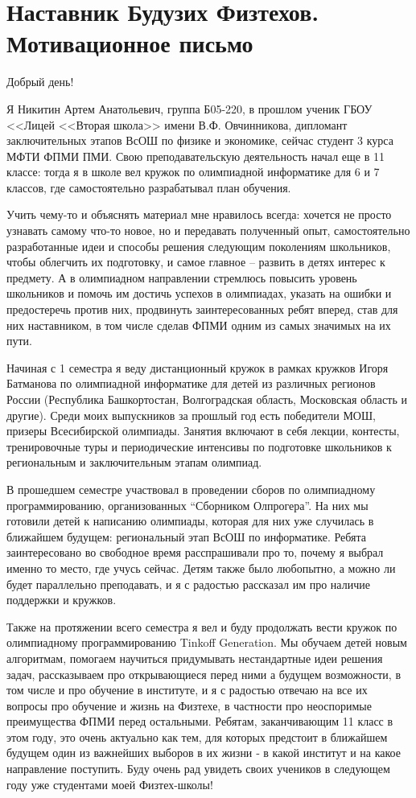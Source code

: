\section{\textbf{Наставник Будузих Физтехов. Мотивационное письмо}}
\smallskip

\quad Добрый день!
\smallskip

\quad Я Никитин Артем Анатольевич, группа Б05-220, в прошлом ученик ГБОУ <<Лицей <<Вторая школа>> имени В.Ф. Овчинникова, дипломант
заключительных этапов ВсОШ по физике и экономике, сейчас студент 3 курса МФТИ ФПМИ ПМИ. Свою преподавательскую деятельность начал еще в 11
классе: тогда я в школе вел кружок по олимпиадной информатике для 6 и 7 классов, где самостоятельно разрабатывал план обучения.

\quad Учить чему-то и объяснять материал мне нравилось всегда: хочется не просто узнавать самому что-то новое, но и передавать полученный опыт,
самостоятельно разработанные идеи и способы решения следующим поколениям школьников, чтобы облегчить их подготовку, и самое главное – развить в
детях интерес к предмету. А в олимпиадном направлении стремлюсь повысить уровень школьников и помочь им достичь успехов в олимпиадах, указать
на ошибки и предостеречь против них, продвинуть заинтересованных ребят вперед, став для них наставником, в том числе сделав ФПМИ одним из самых
значимых на их пути.

\quad Начиная с 1 семестра я веду дистанционный кружок в рамках кружков Игоря Батманова по олимпиадной информатике для детей из различных
регионов России (Республика Башкортостан, Волгоградская область, Московская область и другие). Среди моих выпускников за прошлый год есть
победители МОШ, призеры Всесибирской олимпиады. Занятия включают в себя лекции, контесты, тренировочные туры и периодические интенсивы по
подготовке школьников к региональным и заключительным этапам олимпиад.

\quad В прошедшем семестре участвовал в проведении сборов по олимпиадному программированию, организованных “Сборником Олпрогера”. На них мы
готовили детей к написанию олимпиады, которая для них уже случилась в ближайшем будущем: региональный этап ВсОШ по информатике. Ребята
заинтересовано во свободное время расспрашивали про то, почему я выбрал именно то место, где учусь сейчас. Детям также было любопытно, а можно
ли будет параллельно преподавать, и я с радостью рассказал им про наличие поддержки и кружков.

\quad Также на протяжении всего семестра я вел и буду продолжать вести кружок по олимпиадному программированию Tinkoff Generation. Мы обучаем
детей новым алгоритмам, помогаем научиться придумывать нестандартные идеи решения задач, рассказываем про открывающиеся перед ними а будущем
возможности, в том числе и про обучение в институте, и я с радостью отвечаю на все их вопросы про обучение и жизнь на Физтехе, в частности про
неоспоримые преимущества ФПМИ перед остальными. Ребятам, заканчивающим 11 класс в этом году, это очень актуально как тем, для которых предстоит
в ближайшем будущем один из важнейших выборов в их жизни ‐ в какой институт и на какое направление поступить. Буду очень рад увидеть своих
учеников в следующем году уже студентами моей Физтех-школы!

